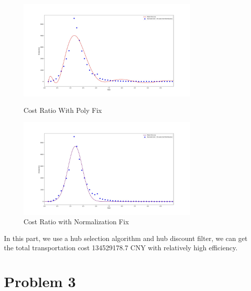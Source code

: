 \documentclass{llncs}
\begin{document}
\begin{figure}[htbp]
\centering
\begin{minipage}[t]{0.48\textwidth}
\centering
\includegraphics[width=9cm]{graph/cost_pro1pro2_poly.jpg}
\caption{Cost Ratio With Poly Fix}
\label{Graph5-1}
\end{minipage}
\begin{minipage}[t]{0.48\textwidth}
\centering
\includegraphics[width=9cm]{graph/cost_pro1pro2_norm.jpg}
\caption{Cost Ratio with Normalization Fix}
\label{Graph5-2}
\end{minipage}
\end{figure}

In this part, we use a hub selection algorithm and hub discount filter, we can get the total transportation cost 134529178.7 CNY with relatively high efficiency.

\newpage
\section{Problem 3}
\end{document}
